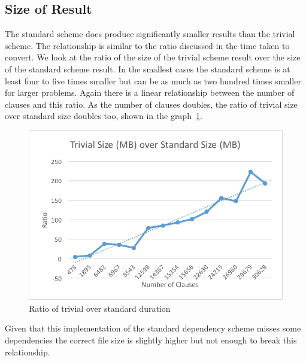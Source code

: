 \subsection{Size of Result}
The standard scheme does produce significantly smaller results than the trivial scheme. The relationship is similar to the ratio discussed in the time taken to convert. We look at the ratio of the size of the trivial scheme result over the size of the standard scheme result. In the smallest cases the standard scheme is at least four to five times smaller but can be as much as two hundred times smaller for larger problems. Again there is a linear relationship between the number of clauses and this ratio. As the number of clauses doubles, the ratio of trivial size over standard size doubles too, shown in the graph~\ref{trivialsizeoverstandardsize}.

\begin{figure}[h]
\caption{Ratio of trivial over standard duration}
\label{trivialsizeoverstandardsize}
\begin{CenteredBox}
\includegraphics{png/trivialsizeoverstandardsize.png}
\end{CenteredBox}
\end{figure}

Given that this implementation of the standard dependency scheme misses some dependencies the correct file size is slightly higher but not enough to break this relationship.

